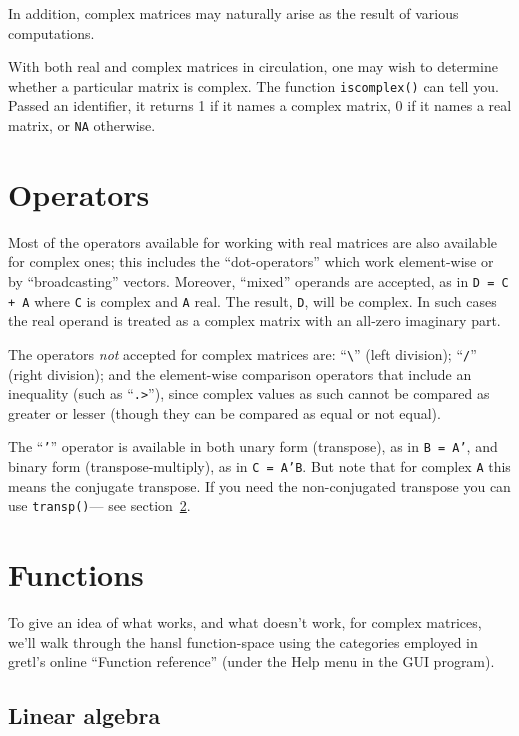 \documentclass{article}
\begin{document}
In addition, complex matrices may naturally arise as the result of
various computations.

With both real and complex matrices in circulation, one may wish to
determine whether a particular matrix is complex. The function
\texttt{iscomplex()} can tell you. Passed an identifier, it returns 1
if it names a complex matrix, 0 if it names a real matrix, or
\texttt{NA} otherwise.

\section{Operators}
\label{sec:ops}

Most of the operators available for working with real matrices are
also available for complex ones; this includes the ``dot-operators''
which work element-wise or by ``broadcasting'' vectors. Moreover,
``mixed'' operands are accepted, as in \texttt{D = C + A} where
\texttt{C} is complex and \texttt{A} real. The result, \texttt{D},
will be complex. In such cases the real operand is treated as a
complex matrix with an all-zero imaginary part.

The operators \textit{not} accepted for complex matrices are:
``\texttt{\textbackslash}'' (left division); ``\texttt{/}'' (right
division); and the element-wise comparison operators that include an
inequality (such as ``\verb+.>+''), since complex values as such
cannot be compared as greater or lesser (though they can be compared
as equal or not equal).

The ``\texttt{'}'' operator is available in both unary form
(transpose), as in \texttt{B = A'}, and binary form
(transpose-multiply), as in \texttt{C = A'B}. But note that for
complex \texttt{A} this means the conjugate transpose. If you need the
non-conjugated transpose you can use \texttt{transp()}--- see
section~\ref{sec:funcs}.

\section{Functions}
\label{sec:funcs}

To give an idea of what works, and what doesn't work, for complex
matrices, we'll walk through the hansl function-space using the
categories employed in gretl's online ``Function reference'' (under the
\textsf{Help} menu in the GUI program).

\subsection{Linear algebra}
\end{document}
